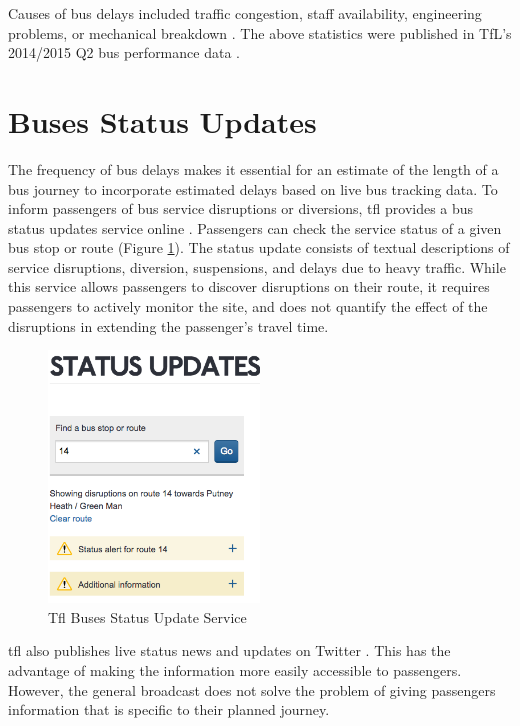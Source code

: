 
\par Causes of bus delays included traffic congestion, staff availability, engineering problems, or mechanical breakdown \cite{buses_performance_data}. The above statistics were published in TfL's 2014/2015 Q2 bus performance data \cite{buses_performance_report}.


\section{Buses Status Updates}

\par The frequency of bus delays makes it essential for an estimate of the length of a bus journey to incorporate estimated delays based on live bus tracking data.
To inform passengers of bus service disruptions or diversions, \acrshort{tfl} provides a bus status updates service online \cite{tfl_buses_status_updates}. Passengers can check the service status of a given bus stop or route (Figure \ref{fig:tfl_status_update}).
The status update consists of textual descriptions of service disruptions, diversion, suspensions, and delays due to heavy traffic.
While this service allows passengers to discover disruptions on their route, it requires passengers to actively monitor the site, and does not quantify the effect of the disruptions in extending the passenger's travel time.

\begin{figure}
\centering
\includegraphics[width=0.5\textwidth]{figures/tfl_status_update.png}
\caption{\label{fig:tfl_status_update} Tfl Buses Status Update Service}
\end{figure}

\par \acrshort{tfl} also publishes live status news and updates on Twitter \cite{tfl_bus_alerts_twitter}. This has the advantage of making the information more easily accessible to passengers. However, the general broadcast does not solve the problem of giving passengers information that is specific to their planned journey.

